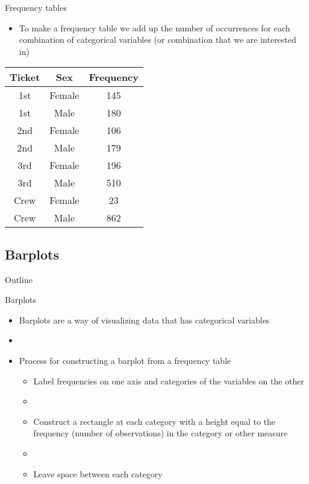 \documentclass[xcolor=dvipsnames]{beamer}
\begin{document}
\begin{frame}{Frequency tables}
	\begin{itemize}
		\item To make a frequency table we add up the number of occurrences for each combination of categorical variables (or combination that we are interested in)
	\end{itemize}
\begin{center}
	\begin{tabular}{|c|c|c|}
		\hline
		\textbf{Ticket} & \textbf{Sex} & \textbf{Frequency} \\
		\hline \hline
		1st & Female & 145\\
		\hline
		1st &  Male & 180\\
		\hline
		2nd & Female & 106\\
		\hline
		2nd  & Male & 179\\
		\hline
		3rd & Female & 196\\
		\hline
		3rd  & Male & 510\\
		\hline
		Crew & Female &  23\\
		\hline
		Crew  & Male & 862\\
		\hline
	\end{tabular}
\end{center}
\end{frame}

\subsection{Barplots}
\begin{frame}{Outline}
\tableofcontents[currentsection,subsectionstyle=show/shaded/hide]
\end{frame}

\begin{frame}{Barplots}
\begin{itemize}
	\item Barplots are a way of visualizing data that has categorical variables \pause
	\item[]
	\item Process for constructing a barplot from a frequency table \pause
		\begin{itemize}
		\item Label frequencies on one axis and categories of the variables on the other \pause
		\item[] 
		\item Construct a rectangle at each category with a height equal to the frequency (number of observations) in the category or other measure \pause
		\item[]
		\item Leave space between each category
	\end{itemize}
\end{itemize}
\end{frame}
\end{document}

